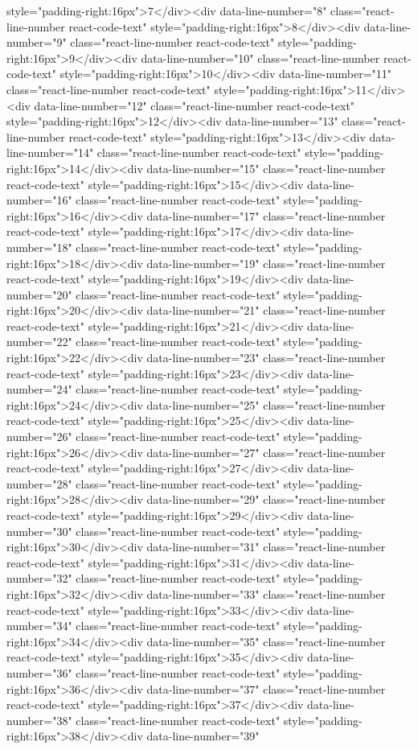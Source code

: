 {{{{{{{{{{{{{{{{{{{{{{{{{{{{{{{style="padding-right:16px">7</div><div data-line-number="8" class="react-line-number react-code-text" style="padding-right:16px">8</div><div data-line-number="9" class="react-line-number react-code-text" style="padding-right:16px">9</div><div data-line-number="10" class="react-line-number react-code-text" style="padding-right:16px">10</div><div data-line-number="11" class="react-line-number react-code-text" style="padding-right:16px">11</div><div data-line-number="12" class="react-line-number react-code-text" style="padding-right:16px">12</div><div data-line-number="13" class="react-line-number react-code-text" style="padding-right:16px">13</div><div data-line-number="14" class="react-line-number react-code-text" style="padding-right:16px">14</div><div data-line-number="15" class="react-line-number react-code-text" style="padding-right:16px">15</div><div data-line-number="16" class="react-line-number react-code-text" style="padding-right:16px">16</div><div data-line-number="17" class="react-line-number react-code-text" style="padding-right:16px">17</div><div data-line-number="18" class="react-line-number react-code-text" style="padding-right:16px">18</div><div data-line-number="19" class="react-line-number react-code-text" style="padding-right:16px">19</div><div data-line-number="20" class="react-line-number react-code-text" style="padding-right:16px">20</div><div data-line-number="21" class="react-line-number react-code-text" style="padding-right:16px">21</div><div data-line-number="22" class="react-line-number react-code-text" style="padding-right:16px">22</div><div data-line-number="23" class="react-line-number react-code-text" style="padding-right:16px">23</div><div data-line-number="24" class="react-line-number react-code-text" style="padding-right:16px">24</div><div data-line-number="25" class="react-line-number react-code-text" style="padding-right:16px">25</div><div data-line-number="26" class="react-line-number react-code-text" style="padding-right:16px">26</div><div data-line-number="27" class="react-line-number react-code-text" style="padding-right:16px">27</div><div data-line-number="28" class="react-line-number react-code-text" style="padding-right:16px">28</div><div data-line-number="29" class="react-line-number react-code-text" style="padding-right:16px">29</div><div data-line-number="30" class="react-line-number react-code-text" style="padding-right:16px">30</div><div data-line-number="31" class="react-line-number react-code-text" style="padding-right:16px">31</div><div data-line-number="32" class="react-line-number react-code-text" style="padding-right:16px">32</div><div data-line-number="33" class="react-line-number react-code-text" style="padding-right:16px">33</div><div data-line-number="34" class="react-line-number react-code-text" style="padding-right:16px">34</div><div data-line-number="35" class="react-line-number react-code-text" style="padding-right:16px">35</div><div data-line-number="36" class="react-line-number react-code-text" style="padding-right:16px">36</div><div data-line-number="37" class="react-line-number react-code-text" style="padding-right:16px">37</div><div data-line-number="38" class="react-line-number react-code-text" style="padding-right:16px">38</div><div data-line-number="39" }}}}}}}}}}}}}}}}}}}}}}}}}}}}}}}
